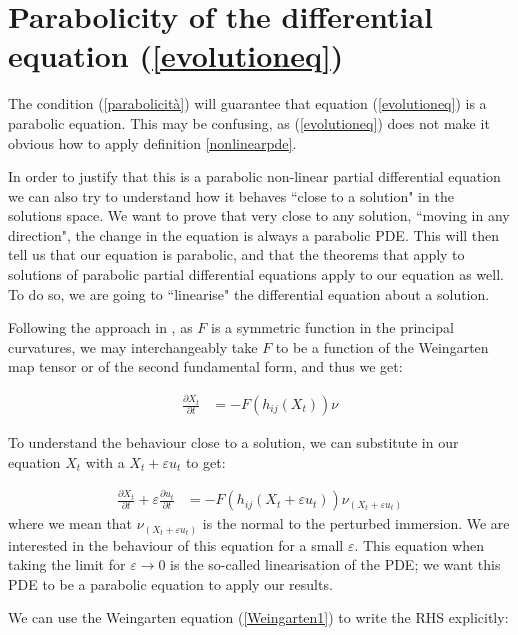 \section{Parabolicity of the differential equation (\ref{evolutioneq})}\label{parabolic}

The condition (\ref{parabolicità}) will  guarantee that equation (\ref{evolutioneq}) is a parabolic equation. This may be confusing, as (\ref{evolutioneq}) does not make it obvious how to apply definition \ref{nonlinearpde}. 

In order to justify that this is a parabolic non-linear partial differential equation we can also try to understand how it behaves ``close to a solution" in the solutions space. We want to prove that very close to any solution, ``moving in any direction", the change in the equation is always a parabolic PDE. This will then tell us that our equation is parabolic, and that the theorems that apply to solutions of parabolic partial differential equations apply to our equation as well. To do so, we are going to ``linearise" the differential equation about a solution. 

Following the approach in \cite{huisken}, as $F$ is a symmetric function in the principal curvatures, we may interchangeably take $F$ to be a function of the Weingarten map tensor or of the second fundamental form, and thus we get:

\begin{align*}
	\frac{\partial X_t}{\partial t} &= - F(h_{ij}(X_t)) \nu
\end{align*}

To understand the behaviour close to a solution, we can substitute in our equation $X_t$ with a $X_t+\varepsilon u_t$ to get:

\begin{align}
	\frac{\partial X_t}{\partial t} + \varepsilon\frac{\partial u_t}{\partial t}  &= - F(h_{ij}(X_t+\varepsilon u_t)) \nu_{(X_t+\varepsilon u_t)}\label{linearizingevolutioneq}
\end{align}
where we mean that  $\nu_{(X_t+\varepsilon u_t)}$ is the normal to the perturbed immersion. 
We are interested in the behaviour of this equation for a small $\varepsilon$. This equation when taking the limit for $\varepsilon \rightarrow 0$ is the so-called linearisation of the PDE; we want this PDE to be a parabolic equation to apply our results.

We can use the Weingarten equation (\ref{Weingarten1}) to write the RHS explicitly:

